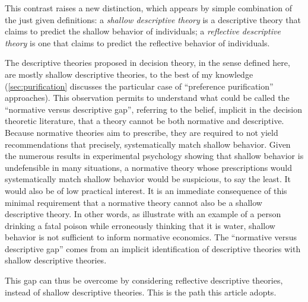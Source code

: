 \documentclass[version=last, pagesize, twoside=off, bibliography=totoc, DIV=calc, fontsize=12pt, a4paper, french, english]{scrartcl}
\begin{document}
This contrast raises a new distinction, which appears by simple combination of the just given definitions: a \emph{shallow descriptive theory} is a descriptive theory that claims to predict the shallow behavior of individuals; a \emph{reflective descriptive theory} is one that claims to predict the reflective behavior of individuals. 

The descriptive theories proposed in decision theory, in the sense defined here, are mostly shallow descriptive theories, to the best of my knowledge (\cref{sec:purification} discusses the particular case of “preference purification” approaches).
This observation permits to understand what could be called the “normative versus descriptive gap”, referring to the belief, implicit in the decision theoretic literature, that a theory cannot be both normative and descriptive. Because normative theories aim to prescribe, they are required to not yield recommendations that precisely, systematically match shallow behavior. Given the numerous results in experimental psychology showing that shallow behavior is undefensible in many situations, a normative theory whose prescriptions would systematically match shallow behavior would be suspicious, to say the least. It would also be of low practical interest.
It is an immediate consequence of this minimal requirement that a normative theory cannot also be a shallow descriptive theory. 
In other words, as \citet{hausman_preference_1994} illustrate with an example of a person drinking a fatal poison while erroneously thinking that it is water, shallow behavior is not sufficient to inform normative economics.
The “normative versus descriptive gap” comes from an implicit identification of descriptive theories with shallow descriptive theories. 

This gap can thus be overcome by considering reflective descriptive theories, instead of shallow descriptive theories. This is the path this article adopts.

\end{document}
